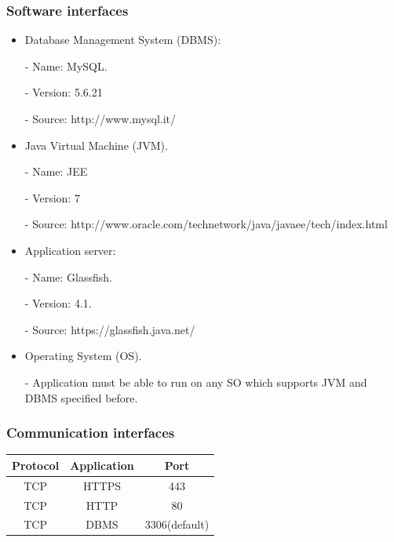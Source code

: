 \documentclass[18pt,oneside,a4paper, titlepage]{article}
\begin{document}
		\subsubsection{Software interfaces}
			\begin{itemize}
				\item Database Management System (DBMS):
				\item[-] Name: MySQL.
				\item[-] Version: 5.6.21
				\item[-] Source: http://www.mysql.it/
				\item Java Virtual Machine (JVM).
				\item[-] Name: JEE
				\item[-] Version: 7
				\item[-] Source: http://www.oracle.com/technetwork/java/javaee/tech/index.html
				\item Application server:
				\item[-] Name: Glassfish.
				\item[-] Version: 4.1.
				\item[-] Source: https://glassfish.java.net/
				\item Operating System (OS).
				\item[-] Application must be able to run on any SO which supports JVM and
				DBMS specified before.
			\end{itemize}
		\subsubsection{Communication interfaces}
			\begin{center}
				\centering
			
				\begin{tabular}{|c| c| c|}
					\hline Protocol & Application & Port \\
					\hline		TCP & HTTPS & 443 \\
					\hline		TCP & HTTP & 80 \\
					\hline		TCP & DBMS & 3306(default)\\
					\hline
				\end{tabular}
			\end{center}
\end{document}

